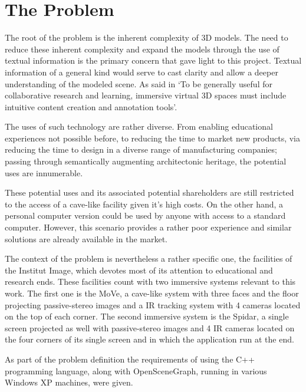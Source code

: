 \section{The Problem}
The root of the problem is the inherent complexity of 3D models. The need to reduce these inherent complexity and expand the models through the use of textual information is the primary concern that gave light to this project. Textual information of a general kind would serve to cast clarity and allow a deeper understanding of the modeled scene. As said in \cite{Kadobayashi} `To be generally useful for collaborative research and learning, immersive virtual 3D spaces must include intuitive content creation and annotation tools'.

The uses of such technology are rather diverse. From enabling educational experiences not possible before, to reducing the time to market new products, via reducing the time to design in a diverse range of manufacturing companies; passing through semantically augmenting architectonic heritage, the potential uses are innumerable.

These potential uses and its associated potential shareholders are still restricted to the access of a cave-like facility given it's high costs. On the other hand, a personal computer version could be used by anyone with access to a standard computer. However, this scenario provides a rather poor experience and similar solutions are already available in the market.

The context of the problem is nevertheless a rather specific one, the facilities of the Institut Image, which devotes most of its attention to educational and research ends. These facilities count with two immersive systems relevant to this work. The first one is the MoVe, a cave-like system with three faces and the floor projecting passive-stereo  images and a IR tracking system with 4 cameras located on the top of each corner. The second immersive system is the Spidar, a single screen projected as well with passive-stereo images and 4 IR cameras located on the four corners of its single screen and in which the application run at the end. 

As part of the problem definition the requirements of using the C++ programming language, along with OpenSceneGraph, running in various Windows XP machines, were given.
